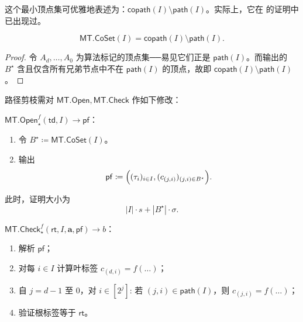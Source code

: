 \documentclass[american,singlepageview]{snargs-book-zh}
\newcommand{\DefineEqual}{\coloneqq}
\newcommand{\ProtoSalt}{\tau}
\newcommand{\ROFunction}{f}
\newcommand{\ROOutputSize}{\sigma}
\newcommand{\MTDepth}{d}
\newcommand{\MTPath}{\mathsf{path}}
\newcommand{\MTCoPath}{\mathsf{copath}}
\newcommand{\MTLayer}{j}
\newcommand{\MTSymbol}{\mathsf{MT}}
\newcommand{\MTOpen}{\MTSymbol.\mathsf{Open}}
\newcommand{\MTCheck}{\MTSymbol.\mathsf{Check}}
\newcommand{\MTSaltSize}{s}
\newcommand{\MTVertexLabel}{c}
\newcommand{\MTVertexLabelByName}[2]{\MTVertexLabel_{(#1,#2)}}
\newcommand{\MTCommitment}{\mathsf{rt}}
\newcommand{\MTTrapdoor}{\mathsf{td}}
\newcommand{\MTProof}{\mathsf{pf}}
\newcommand{\MTMessageIndex}{i}
\newcommand{\MTMessageIndexSet}{I}
\newcommand{\MTMessageSubVector}{\mathbf{a}}
\newcommand{\MTSaltString}{\ProtoSalt}
\newcommand{\MTDeriveVertexSet}{\MTSymbol.\mathsf{CoSet}}
\newcommand{\MTPathVertexSet}{A}
\newcommand{\MTCoPathVarVertexSet}{B^{\star}}
\begin{document}
这个最小顶点集可优雅地表述为：\(\MTCoPath(\MTMessageIndexSet)\setminus\MTPath(\MTMessageIndexSet)\)。实际上，它在  的证明中已出现过。

\begin{lemma}
\label{lemma:path-pruning-is-copaths-minus-paths}
\[
  \MTDeriveVertexSet(\MTMessageIndexSet)
  =\MTCoPath(\MTMessageIndexSet)\setminus\MTPath(\MTMessageIndexSet).
\]
\end{lemma}

\begin{proof}
令
\(\MTPathVertexSet_{\MTDepth},\dots,\MTPathVertexSet_{0}\)
为算法标记的顶点集──易见它们正是
\(\MTPath(\MTMessageIndexSet)\)。而输出的
\(\MTCoPathVarVertexSet\) 含且仅含所有兄弟节点中不在
\(\MTPath(\MTMessageIndexSet)\) 的顶点，故即
\(\MTCoPath(\MTMessageIndexSet)\setminus\MTPath(\MTMessageIndexSet)\)。
\end{proof}

路径剪枝需对
\(\MTOpen,\MTCheck\) 作如下修改：

\medskip
\noindent\textbf{\(\MTOpen_{\star}^{\ROFunction}(\MTTrapdoor,\MTMessageIndexSet)\to\MTProof\)}：
\begin{enumerate}[nolistsep]
  \item 令
  \(\MTCoPathVarVertexSet\DefineEqual\MTDeriveVertexSet(\MTMessageIndexSet)\)。
  \item 输出
  \[
    \MTProof\DefineEqual
    \Bigl(
      (\MTSaltString_{\MTMessageIndex})_{\MTMessageIndex\in\MTMessageIndexSet},
      (\MTVertexLabelByName{\MTLayer}{\MTMessageIndex})_{(\MTLayer,\MTMessageIndex)\in\MTCoPathVarVertexSet}
    \Bigr).
  \]
\end{enumerate}
此时，证明大小为
\[
  |\MTMessageIndexSet|\cdot\MTSaltSize
  +|\MTCoPathVarVertexSet|\cdot\ROOutputSize.
\]

\medskip
\noindent\textbf{\(\MTCheck_{\star}^{\ROFunction}(\MTCommitment,\MTMessageIndexSet,\MTMessageSubVector,\MTProof)\to b\)}：
\begin{enumerate}[nolistsep]
  \item 解析 \(\MTProof\)；
  \item 对每 \(\MTMessageIndex\in\MTMessageIndexSet\)
    计算叶标签
    \(\MTVertexLabelByName{\MTDepth}{\MTMessageIndex}
      =\ROFunction(\dots)\)；
  \item 自 \(\MTLayer=\MTDepth-1\) 至 \(0\)，对 \(\MTMessageIndex\in[2^{\MTLayer}]\):
    若 \((\MTLayer,\MTMessageIndex)\in\MTPath(\MTMessageIndexSet)\)，则
    \(\MTVertexLabelByName{\MTLayer}{\MTMessageIndex}
      =\ROFunction(\dots)\)；
  \item 验证根标签等于 \(\MTCommitment\)。
\end{enumerate}
\end{document}
